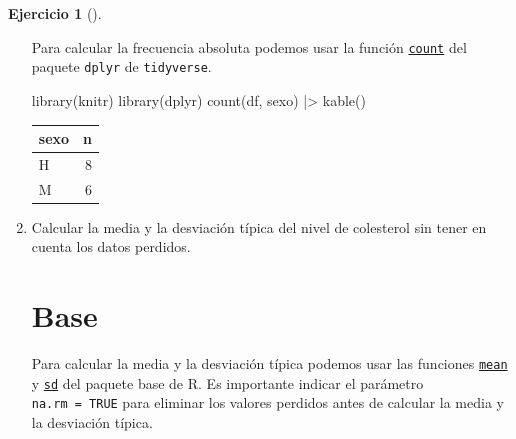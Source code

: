\documentclass[
  spanish,
  a4paper,
]{scrreport}
\newenvironment{Shaded}{\begin{snugshade}}{\end{snugshade}}
\newcommand{\FunctionTok}[1]{\textcolor[rgb]{0.28,0.35,0.67}{#1}}
\newcommand{\NormalTok}[1]{\textcolor[rgb]{0.00,0.23,0.31}{#1}}
\newcommand{\SpecialCharTok}[1]{\textcolor[rgb]{0.37,0.37,0.37}{#1}}
\theoremstyle{definition}
\newtheorem{exercise}{Ejercicio}[chapter]
\theoremstyle{remark}
\begin{document}
\begin{exercise}[]
\begin{enumerate}
\begin{tcolorbox}
  Para calcular la frecuencia absoluta podemos usar la función
  \href{https://aprendeconalf.es/manual-r/06-preprocesamiento.html\#conteo-del-n\%C3\%BAmero-de-observaciones}{\texttt{count}}
  del paquete \texttt{dplyr} de \texttt{tidyverse}.

\begin{Shaded}
\begin{Highlighting}[]
\FunctionTok{library}\NormalTok{(knitr)}
\FunctionTok{library}\NormalTok{(dplyr)}
\FunctionTok{count}\NormalTok{(df, sexo) }\SpecialCharTok{|\textgreater{}} \FunctionTok{kable}\NormalTok{()}
\end{Highlighting}
\end{Shaded}

  \begin{longtable}[]{@{}lr@{}}
  \toprule\noalign{}
  sexo & n \\
  \midrule\noalign{}
  \endhead
  \bottomrule\noalign{}
  \endlastfoot
  H & 8 \\
  M & 6 \\
  \end{longtable}

  \end{tcolorbox}
\item
  Calcular la media y la desviación típica del nivel de colesterol sin
  tener en cuenta los datos perdidos.

  \begin{tcolorbox}[enhanced jigsaw, colback=white, coltitle=black, toprule=.15mm, rightrule=.15mm, opacitybacktitle=0.6, opacityback=0, bottomtitle=1mm, toptitle=1mm, titlerule=0mm, breakable, leftrule=.75mm, title=\textcolor{quarto-callout-tip-color}{\faLightbulb}\hspace{0.5em}{Solución}, arc=.35mm, left=2mm, bottomrule=.15mm, colframe=quarto-callout-tip-color-frame, colbacktitle=quarto-callout-tip-color!10!white]

  \section{Base}

  Para calcular la media y la desviación típica podemos usar las
  funciones
  \href{https://www.rdocumentation.org/packages/base/versions/3.6.2/topics/mean}{\texttt{mean}}
  y
  \href{https://www.rdocumentation.org/packages/stats/versions/3.6.2/topics/sd}{\texttt{sd}}
  del paquete base de R. Es importante indicar el parámetro
  \texttt{na.rm\ =\ TRUE} para eliminar los valores perdidos antes de
  calcular la media y la desviación típica.


\end{tcolorbox}
\end{enumerate}
\end{exercise}
\end{document}
